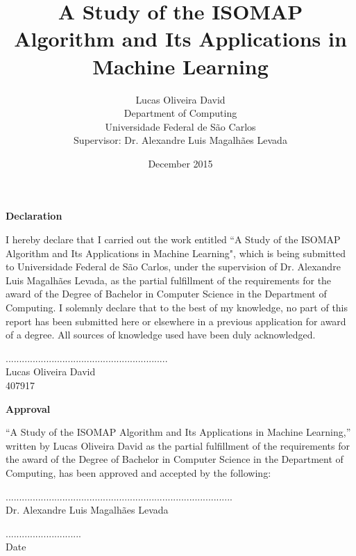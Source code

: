 \documentclass[12pt]{report}
\begin{document}
	
\title{A Study of the ISOMAP Algorithm and Its Applications in Machine Learning}
\author{Lucas Oliveira David\\[2cm]
	Department of Computing\\
	Universidade Federal de São Carlos\\[2cm]
	Supervisor: Dr. Alexandre Luis Magalhães Levada}
\date{\vfill December 2015}
\maketitle


\begin{center}
	\textbf{Declaration}
\end{center}

I hereby declare that I carried out the work entitled ``A Study of the ISOMAP Algorithm and Its Applications in Machine Learning", which is being submitted to Universidade Federal de São Carlos, under the supervision of Dr. Alexandre Luis Magalhães Levada, as the partial fulfillment of the requirements for the award of the Degree of Bachelor  in Computer Science in the Department of Computing.
I solemnly declare that to the best of my knowledge, no part of this report has been submitted here or elsewhere in a previous application for award of a degree. All sources of knowledge used have been duly acknowledged.

\vfill

\begin{center}
	............................................................\\
	Lucas Oliveira David\\
	407917	
\end{center}

\newpage
\begin{center}
	\textbf{Approval}
\end{center}

“A Study of the ISOMAP Algorithm and Its Applications in Machine Learning,” written by Lucas Oliveira David as the partial fulfillment of the requirements for the award of the Degree of Bachelor  in Computer Science in the Department of Computing, has been approved and accepted by the following:

\vfill

\begin{minipage}{.7\linewidth}
	....................................................................................\\
	Dr. Alexandre Luis Magalhães Levada
\end{minipage}%
\begin{minipage}{.3\linewidth}
	\begin{flushright}
		............................\\
		Date
	\end{flushright}
\end{minipage}\\[1.5cm]
\end{document}
